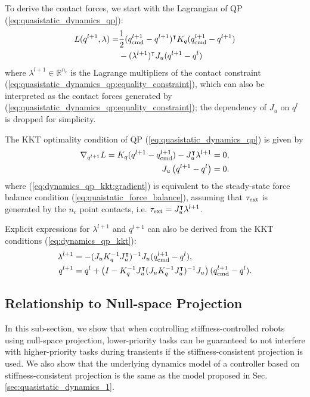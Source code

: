 To derive the contact forces, we start with the Lagrangian of QP (\ref{eq:quasistatic_dynamics_qp}):
\begin{equation}
\begin{aligned}
L(q^{l+1}, \lambda) = &\frac{1}{2} (\qcmd[l+1] - q^{l+1})^\intercal K_q (\qcmd[l+1] - q^{l+1}) \\
&- (\lambda^{l+1})^\intercal J_u(q^{l+1} - q^l)
\end{aligned}
\end{equation}
where $\lambda^{l+1} \in \mathbb{R}^{n_c}$ is the Lagrange multipliers of the contact constraint (\ref{eq:quasistatic_dynamics_qp:equality_constraint}), which can also be interpreted as the contact forces generated by (\ref{eq:quasistatic_dynamics_qp:equality_constraint}); the dependency of $J_u$ on $q^l$ is dropped for simplicity.

The KKT optimality condition of QP (\ref{eq:quasistatic_dynamics_qp}) is given by
\begin{subequations}

\label{eq:dynamics_qp_kkt}
\begin{align}
\nabla_{q^{l+1}}L = K_q (q^{l+1} - \qcmd[l+1]) - J_u^\intercal \lambda^{l+1} &= 0, \label{eq:dynamics_qp_kkt:gradient} \\
  J_u \left(q^{l+1} - q^l\right) &= 0. \label{eq:dynamics_qp_kkt:equality_constraint}
\end{align}
\end{subequations}
where (\ref{eq:dynamics_qp_kkt:gradient}) is equivalent to the steady-state force balance condition (\ref{eq:quaistatic_force_balance}), assuming that $\tauE$ is generated by the $n_c$ point contacts, i.e. $\tauE = J_u^\intercal \lambda^{l+1}$.

Explicit expressions for $\lambda^{l+1}$ and $q^{l+1}$ can also be derived from the KKT conditions (\ref{eq:dynamics_qp_kkt}):
\begin{subequations}

\label{eq:explicit_force_and_state}
\begin{align}
\lambda^{l+1} &= -(J_u K_q^{-1} J_u^\intercal)^{-1} J_u (\qcmd[l+1] - q^l), \label{eq:explicit_force_and_state:force}\\
q^{l+1} &= q^l + \left(I -  K_q^{-1}J_u^\intercal (J_u K_q^{-1} J_u^\intercal)^{-1}J_u \right) (\qcmd[l+1] - q^l). \label{eq:explicit_force_and_state:state}
\end{align}
\end{subequations}


\subsection{Relationship to Null-space Projection}
In this sub-section, we show that when controlling stiffness-controlled robots using null-space projection, lower-priority tasks can be guaranteed to not interfere with higher-priority tasks during transients if the stiffness-consistent projection \cite{dietrich2015overview} is used. We also show that the underlying dynamics model of a controller based on stiffness-consistent projection is the same as the model proposed in Sec. \ref{sec:quasistatic_dynamics_1}. 


